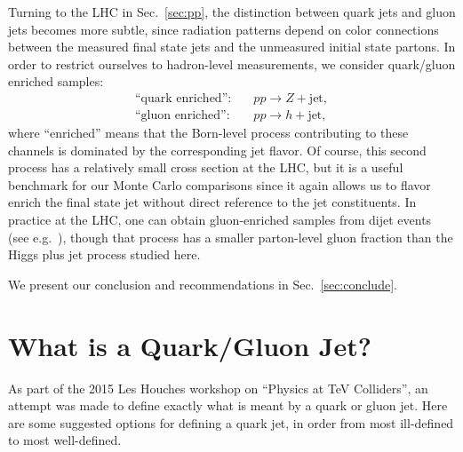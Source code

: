 \documentclass[11pt,letterpaper]{article}
\DeclareRobustCommand{\Sec}[1]{Sec.~\ref{#1}}
\begin{document}
Turning to the LHC in \Sec{sec:pp}, the distinction between quark jets and gluon jets becomes more subtle, since radiation patterns depend on color connections between the measured final state jets and the unmeasured initial state partons.  In order to restrict ourselves to hadron-level measurements, we consider quark/gluon enriched samples:
\begin{align}
\text{``quark enriched''}: \quad & pp \to Z + \text{jet}, \\
\text{``gluon enriched''}: \quad & pp \to h + \text{jet},
\end{align}
where ``enriched'' means that the Born-level process contributing to these channels is dominated by the corresponding jet flavor.  Of course, this second process has a relatively small cross section at the LHC, but it is a useful benchmark for our Monte Carlo comparisons since it again allows us to flavor enrich the final state jet without direct reference to the jet constituents.  In practice at the LHC, one can obtain gluon-enriched samples from dijet events (see e.g.~\cite{}), though that process has a smaller parton-level gluon fraction than the Higgs plus jet process studied here.

We present our conclusion and recommendations in \Sec{sec:conclude}.

\section{What is a Quark/Gluon Jet?}
\label{sec:quarkgluondef}

As part of the 2015 Les Houches workshop on ``Physics at TeV Colliders'', an attempt was made to define exactly what is meant by a quark or gluon jet.  Here are some suggested options for defining a quark jet, in order from most ill-defined to most well-defined.
\end{document}
